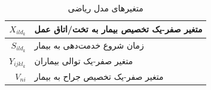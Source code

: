 \begin{table}[ht]
	\caption{متغیرهای مدل ریاضی}
	\label{tab:modelVariables}
	\centering
	\onehalfspacing
	\begin{tabularx}{0.9\textwidth}{|r|X|}
		\hline
		$X_{ild_{k}}$	& متغیر صفر-یک تخصیص بیمار به تخت/اتاق عمل\\
		\hline
		$S_{ild_{k}}$	& زمان شروع خدمت‌دهی به بیمار \\
		\hline
		$Y_{ijkl_{k}}$	& متغیر صفر-یک توالی بیماران \\
		\hline
		$V_{ni}$		& متغیر صفر-یک تخصیص جراح به بیمار‍‍ \\
		\hline
	\end{tabularx}
\end{table}
